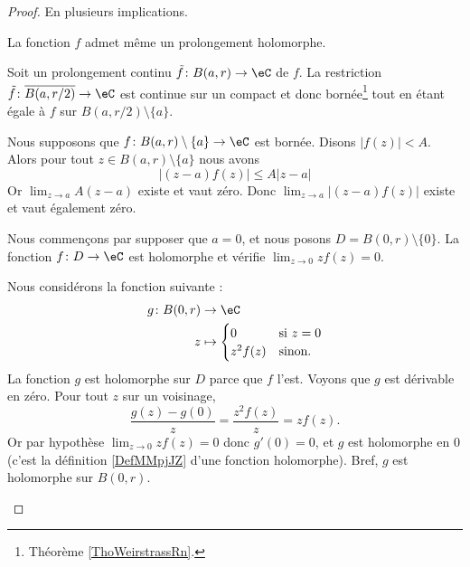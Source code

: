 \begin{proof}
	En plusieurs implications.
	\begin{subproof}
		La fonction \( f\) admet même un prolongement holomorphe.

		Soit un prolongement continu \( \tilde f\colon B(a,r)\to \eC\) de \( f\). La restriction \( \tilde f\colon \overline{ B(a,r/2) }\to \eC\) est continue sur un compact et donc bornée\footnote{Théorème \ref{ThoWeirstrassRn}.} tout en étant égale à \( f\) sur \( B(a,r/2)\setminus\{ a \}\).

		Nous supposons que \( f\colon B(a,r)\setminus\{ a \}\to \eC\) est bornée. Disons \( | f(z) |<A\). Alors pour tout \( z\in B(a,r)\setminus\{ a \}\) nous avons
		\begin{equation}
			| (z-a)f(z) |\leq A| z-a |
		\end{equation}
		Or \( \lim_{z\to a}A(z-a)\) existe et vaut zéro. Donc \( \lim_{z\to a}| (z-a)f(z) |\) existe et vaut également zéro.

		\spitem[\ref{ITEMooETRWooDTTpxs} implique \ref{ITEMooMLXJooMfuifN} si \( a=0\)]

		Nous commençons par supposer que \( a=0\), et nous posons \( D=B(0,r)\setminus\{ 0 \}\). La fonction \( f\colon D\to \eC\) est holomorphe et vérifie \( \lim_{z\to 0}zf(z)=0\).

		Nous considérons la fonction suivante :
		\begin{equation}
			\begin{aligned}
				g\colon B(0,r) & \to \eC                          \\
				z              & \mapsto \begin{cases}
					                         0       & \text{si } z=0 \\
					                         z^2f(z) & \text{sinon. }
				                         \end{cases}
			\end{aligned}
		\end{equation}
		La fonction \( g\) est holomorphe sur \( D\) parce que \( f\) l'est. Voyons que \( g\) est dérivable en zéro. Pour tout \( z\) sur un voisinage,
		\begin{equation}
			\frac{ g(z)-g(0) }{ z }=\frac{ z^2f(z) }{ z }=zf(z).
		\end{equation}
		Or par hypothèse \( \lim_{z\to 0}zf(z)=0\) donc \( g'(0)=0\), et \( g\) est holomorphe en \( 0\) (c'est la définition \ref{DefMMpjJZ} d'une fonction holomorphe). Bref, \( g\) est holomorphe sur \( B(0,r)\).


\end{subproof}
\end{proof}
